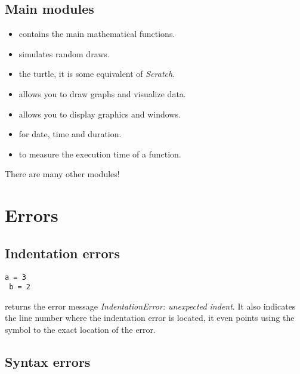 \documentclass[11pt,class=report,crop=false]{standalone}
\begin{document}
\subsection{Main modules}


\begin{itemize}
  \item {} \quad contains the main mathematical functions. 
  \item {} \quad simulates random draws.
  \item {}\quad the \Python{} turtle, it is some equivalent of \emph{Scratch}.
  \item {} \quad allows you to draw graphs and visualize data.
  \item {} \quad allows you to display graphics and windows.
  \item {} \quad for date, time and duration.
  \item {} \quad to measure the execution time of a function.
\end{itemize}

There are many other modules!



\section{Errors}

\subsection{Indentation errors}

\begin{lstlisting}
a = 3
 b = 2
\end{lstlisting}

\Python{} returns the error message \emph{IndentationError: unexpected indent}.
It also indicates the line number where the indentation error is located, it even points using the symbol \og{}\ci{\^}\fg{} to the exact location of the error.

\subsection{Syntax errors}
\end{document}

